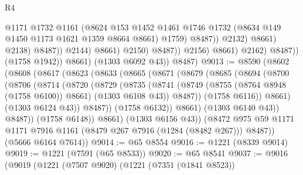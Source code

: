 \begin{lexlean}{R4}
\begin{coremodule}
                                              @1171
                                              @1732
                                              @1161
                                              (@8624
                                                @153
                                                @1452
                                                @1461
                                                @1746
                                                @1732
                                                (@8634 @149 @1450 @1173 @1621 @1359 @8664 @8661)
                                                @1759)
                                              @8487))
                                          @2132)
                                        @8661)
                                      @2138)
                                    @8487))
                                @2144)
                              @8661)
                            @2150)
                          @8487))
                      @2156)
                    @8661)
                  @2162)
                @8487))
            (@1758 @1942))
          @8661)
        (@1303 @6092 @43))
      @8487)
@9013 := @8590
    (@8602
      (@8608
        (@8617
          (@8623
            (@8633
              (@8665
                (@8671
                  (@8679
                    (@8685
                      (@8694
                        (@8700
                          (@8706
                            (@8714
                              (@8720
                                (@8729
                                  (@8735
                                    (@8741
                                      (@8749
                                        (@8755 (@8764 @8948 (@1758 @6100)) @8661)
                                        (@1303 @6108 @43))
                                      @8487))
                                  (@1758 @6116))
                                @8661)
                              (@1303 @6124 @43))
                            @8487))
                        (@1758 @6132))
                      @8661)
                    (@1303 @6140 @43))
                  @8487))
              (@1758 @6148))
            @8661)
          (@1303 @6156 @43))
        (@8472 @975 @59 @1171 @1171 @7916 @1161 (@8479 @267 @7916 (@1284 (@8482 @267))) @8487))
      (@5666 @6164 @7614))
@9014 := @65 @8554
@9016 := @1221 (@8339 @9014)
@9019 := @1221 (@7591 (@65 @8533))
@9020 := @65 @8541
@9037 := @9016
    (@9019
      (@1221
        (@7507 @9020)
        (@1221
          (@7351 (@1841 @8523))

\end{coremodule}
\end{lexlean}
